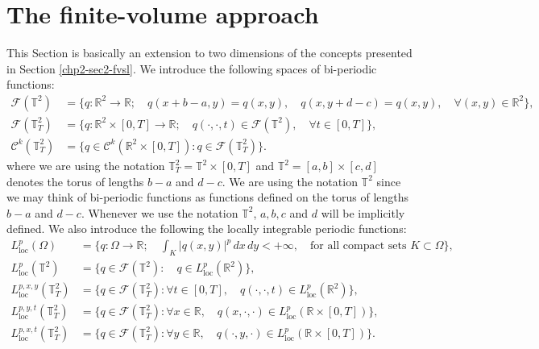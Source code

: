 \section{The finite-volume approach}
\label{sec:fv-2d}
This Section is basically an extension to two dimensions of the concepts presented in Section \ref{chp2-sec2-fvsl}.
We introduce the following spaces of bi-periodic functions:
\begin{align*}
	\mathcal{F}(\mathbb{T}^2) &= \{q:\mathbb{R}^2 \to \mathbb{R};
	\quad q(x+b-a,y) = q(x,y), \quad q(x,y+d-c) = q(x,y),\quad \forall (x,y) \in \mathbb{R}^2\},\\
	\mathcal{F}(\mathbb{T}^2_{T}) &= \{q:\mathbb{R}^2\times[0,T]\to \mathbb{R};\quad q(\cdot,\cdot,t) \in \mathcal{F}(\mathbb{T}^2), \quad \forall t \in [0,T]\},\\
	\mathcal{C}^k(\mathbb{T}^2_{T}) &= \{q\in \mathcal{C}^k(\mathbb{R}^2\times[0,T]): q \in \mathcal{F}(\mathbb{T}^2_{T})\}.
\end{align*}
where we are using the notation $\mathbb{T}^2_{T} = \mathbb{T}^2\times[0,T]$ and $\mathbb{T}^2 = [a,b] \times [c,d]$ denotes the torus of lengths $b-a$ and $d-c$.
We are using the notation $\mathbb{T}^2$ since we may think of bi-periodic functions as functions defined on the torus of lengths $b-a$ and $d-c$.
Whenever we use the notation $\mathbb{T}^2$, $a, b, c$ and $d$ will be implicitly defined.
We also introduce the following the locally integrable periodic functions:
\begin{align*}
	L^p_{\text{loc}}(\Omega) &= \{q:\Omega\to \mathbb{R};\quad \int_{K} |q(x,y)|^p\,dx\,dy  < +\infty, \quad \text{for all compact sets } K \subset \Omega\},\\
	{L}^{p}_{\text{loc}}(\mathbb{T}^2) &= \{q\in \mathcal{F}(\mathbb{T}^2): \quad  q \in L^p_{\text{loc}}(\mathbb{R}^2)\},\\
	{L}^{p,x,y}_{\text{loc}}(\mathbb{T}^2_{T}) &= \{q\in \mathcal{F}(\mathbb{T}^2_{T}): \forall t \in [0,T], \quad q(\cdot,\cdot,t) \in L^p_{\text{loc}}(\mathbb{R}^2)\},\\
	{L}^{p,y,t}_{\text{loc}}(\mathbb{T}^2_{T}) &= \{q\in \mathcal{F}(\mathbb{T}^2_{T}): \forall x \in \mathbb{R},\quad q(x,\cdot,\cdot) \in L^p_{\text{loc}}(\mathbb{R}\times [0,T])\},\\
	{L}^{p,x,t}_{\text{loc}}(\mathbb{T}^2_{T}) &= \{q\in \mathcal{F}(\mathbb{T}^2_{T}): \forall y \in \mathbb{R},\quad q(\cdot,y,\cdot) \in L^p_{\text{loc}}(\mathbb{R}\times [0,T])\}.\\
\end{align*}

